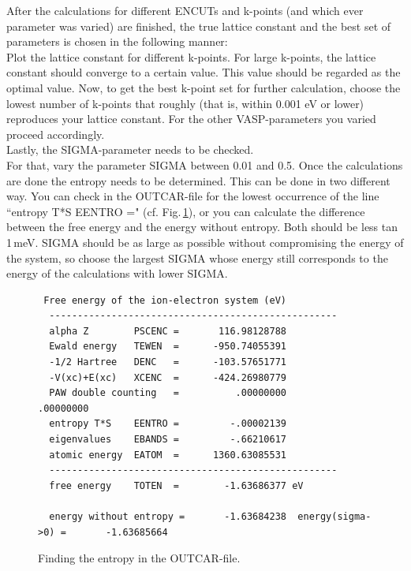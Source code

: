 \documentclass[11pt,oneside,a4paper, captions=nooneline, headsepline]{article}%
\begin{document}
After the calculations for different ENCUTs and k-points (and which ever parameter was varied) are finished, the true lattice constant and the best set of parameters is chosen in the following manner:\\
Plot the lattice constant for different k-points. For large k-points, the lattice constant should converge to a certain value. This value should be regarded as the optimal value. Now, to get the best k-point set for further calculation, choose the lowest number of k-points that roughly (that is, within 0.001 eV or lower) reproduces your lattice constant. For the other VASP-parameters you varied proceed accordingly.\\
Lastly, the SIGMA-parameter needs to be checked.\\
For that, vary the parameter SIGMA between 0.01 and 0.5. Once the calculations are done the entropy needs to be determined. This can be done in two different way. You can check in the OUTCAR-file for the lowest occurrence of the line ``entropy T*S    EENTRO =" (cf. Fig.\,\ref{ent1}), or you can calculate the difference between the free energy and the energy without entropy. Both should be less tan 1\,meV. SIGMA should be as large as possible without compromising the energy of the system, so choose the largest SIGMA whose energy still corresponds to the energy of the calculations with lower SIGMA.\\
\begin{figure}[h!!]
\begin{verbatim}
 Free energy of the ion-electron system (eV)
  ---------------------------------------------------
  alpha Z        PSCENC =       116.98128788
  Ewald energy   TEWEN  =      -950.74055391
  -1/2 Hartree   DENC   =      -103.57651771
  -V(xc)+E(xc)   XCENC  =      -424.26980779
  PAW double counting   =          .00000000         .00000000
  entropy T*S    EENTRO =         -.00002139
  eigenvalues    EBANDS =         -.66210617
  atomic energy  EATOM  =      1360.63085531
  ---------------------------------------------------
  free energy    TOTEN  =        -1.63686377 eV

  energy without entropy =       -1.63684238  energy(sigma->0) =       -1.63685664  
\end{verbatim}
\caption{Finding the entropy in the OUTCAR-file.}
\label{ent1}
\end{figure}
\end{document}
